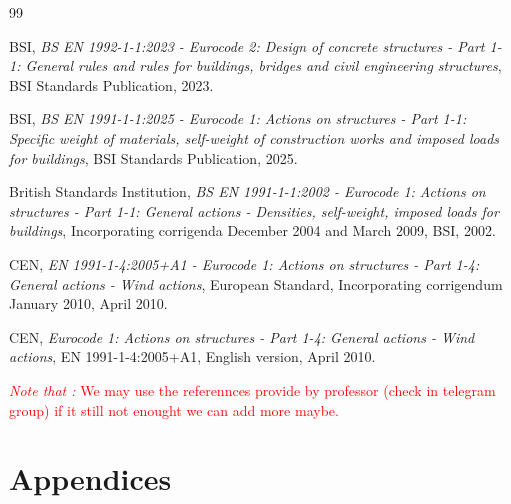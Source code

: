 \documentclass[12pt,twoside,a4paper,openany]{report}
\begin{document}
\clearpage
\renewcommand{\chapter}{\section}
\renewcommand{\thechapter}{} %
\renewcommand{\bibname}{References}  %
\begin{thebibliography}{99}
BSI, \textit{BS EN 1992-1-1:2023 - Eurocode 2: Design of concrete structures - Part 1-1: General rules and rules for buildings, bridges and civil engineering structures}, BSI Standards Publication, 2023.

BSI, \textit{BS EN 1991-1-1:2025 - Eurocode 1: Actions on structures - Part 1-1: Specific weight of materials, self-weight of construction works and imposed loads for buildings}, BSI Standards Publication, 2025.

British Standards Institution, \textit{BS EN 1991-1-1:2002 - Eurocode 1: Actions on structures - Part 1-1: General actions - Densities, self-weight, imposed loads for buildings}, Incorporating corrigenda December 2004 and March 2009, BSI, 2002.

CEN, \textit{EN 1991-1-4:2005+A1 - Eurocode 1: Actions on structures - Part 1-4: General actions - Wind actions}, European Standard, Incorporating corrigendum January 2010, April 2010.

CEN, \textit{Eurocode 1: Actions on structures - Part 1-4: General actions - Wind actions}, EN 1991-1-4:2005+A1, English version, April 2010.

\end{thebibliography}

\noindent \textcolor{red}{\textit{Note that :} We may use the referennces provide by professor (check in telegram group) if it still not enought we can add more maybe.}
\clearpage

\section*{Appendices}

\end{document}
